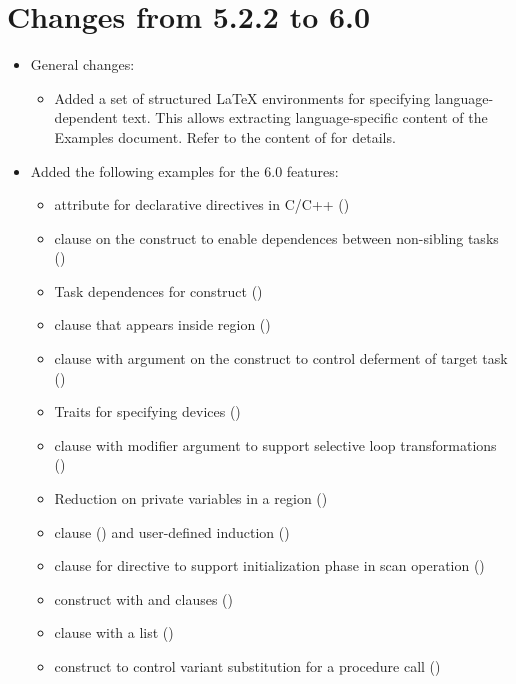 \label{chap:history}

\section{Changes from 5.2.2 to 6.0}
\label{sec:history_522_to_60}

\begin{itemize}
\item General changes:
\begin{itemize}
  \item Added a set of structured LaTeX environments for specifying
    language-dependent text.  This allows extracting language-specific
    content of the Examples document.  Refer to the content of
     for details.
\end{itemize}

\item Added the following examples for the 6.0 features:
\begin{itemize}
  \item {} attribute for declarative directives in C/C++
    ()
  \item {} clause on the  construct to enable dependences
     between non-sibling tasks ()
  \item Task dependences for  construct
    ()
  \item {} clause that appears inside  region
    ()
  \item {} clause with argument on the  construct to control deferment 
     of target task ()
  \item Traits for specifying devices ()
  \item {} clause with modifier argument to 
    support selective loop transformations
    ()
  \item Reduction on private variables in a  region
    ()
  \item {} clause ()
    and user-defined induction ()
  \item {} clause for  directive to 
    support initialization phase in scan operation
    ()
  \item {} construct with  and  clauses ()
  \item {} clause with a list
    ()
  \item {} construct to control variant substitution
    for a procedure call ()
\end{itemize}


\end{itemize}
